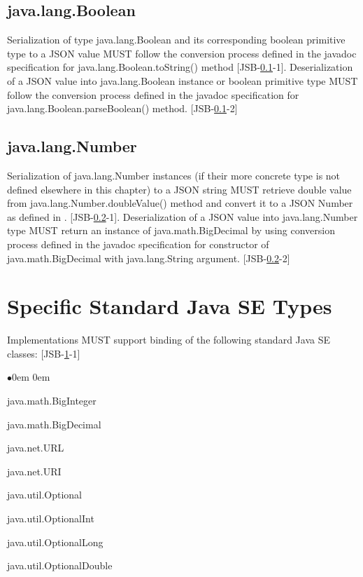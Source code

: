 \subsection{java.lang.Boolean}
\label{subsec:boolean}
Serialization of type java.lang.Boolean and its corresponding boolean primitive type to a JSON value 
MUST follow the conversion process defined in the javadoc specification for java.lang.Boolean.toString() method [JSB-\ref{subsec:boolean}-1]. 
Deserialization of a JSON value into java.lang.Boolean instance or boolean primitive type
MUST follow the conversion process defined in the javadoc specification for java.lang.Boolean.parseBoolean() method. [JSB-\ref{subsec:boolean}-2]

\subsection{java.lang.Number}
\label{subsec:abstractnumber}
Serialization of java.lang.Number instances (if their more concrete type is not defined elsewhere in this chapter) to a JSON string 
MUST retrieve double value from java.lang.Number.doubleValue() method and convert it to a JSON Number as defined in . [JSB-\ref{subsec:abstractnumber}-1]. 
Deserialization of a JSON value into java.lang.Number type MUST return an instance of java.math.BigDecimal by using conversion process defined 
in the javadoc specification for constructor of java.math.BigDecimal with java.lang.String argument. [JSB-\ref{subsec:abstractnumber}-2]

\section{Specific Standard Java SE Types}
\label{sec:specific}
Implementations MUST support binding of the following standard Java SE classes: [JSB-\ref{sec:specific}-1]
\begin{list}{$\bullet$}{\parsep 0em  0em}
\item java.math.BigInteger
\item java.math.BigDecimal
\item java.net.URL
\item java.net.URI
\item java.util.Optional
\item java.util.OptionalInt
\item java.util.OptionalLong
\item java.util.OptionalDouble
\end{list}

